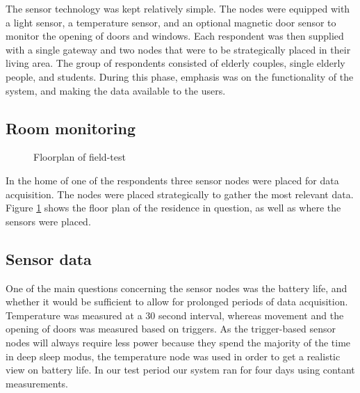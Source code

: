 \documentclass{below-ext}
\begin{document}
The sensor technology was kept relatively simple. The nodes were equipped with a light sensor, a temperature sensor, and an optional magnetic door sensor to monitor the opening of doors and windows. Each respondent was then supplied with a single gateway and two nodes that were to be strategically placed in their living area. The group of respondents consisted of elderly couples, single elderly people, and students. During this phase, emphasis was on the functionality of the system, and making the data available to the users. 

\subsection{Room monitoring}

\begin{figure}
\caption{Floorplan of field-test}
\label{fig:floorplan}
\end{figure}
In the home of one of the respondents three sensor nodes were placed for data acquisition. The nodes were placed strategically to gather the most relevant data. Figure \ref{fig:floorplan} shows the floor plan of the residence in question, as well as where the sensors were placed.

\subsection{Sensor data}
One of the main questions concerning the sensor nodes was the battery life, and whether it would be sufficient to allow for prolonged periods of data acquisition. Temperature was measured at a 30 second interval, whereas movement and the opening of doors was measured based on triggers. As the trigger-based sensor nodes will always require less power because they spend the majority of the time in deep sleep modus, the temperature node was used in order to get a realistic view on battery life. In our test period our system ran for four days using contant measurements.
\end{document}
